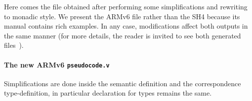 \documentclass[a4paper, 11pt]{article}
\begin{document}
\hspace{1ex}

Here comes the file obtained after performing some simplifications and rewriting to monadic style. We present the ARMv6 file rather than the SH4 because its manual contains rich examples. In any case, modifications affect both outputs in the same manner (for more details, the reader is invited to see both generated files~\cite{urlsscert}).
\paragraph{The new ARMv6 {\tt pseudocode.v}}
Simplifications are done inside the semantic definition and the correspondence type-definition, in particular declaration for types remains the same.

\hspace{1ex}
\end{document}
